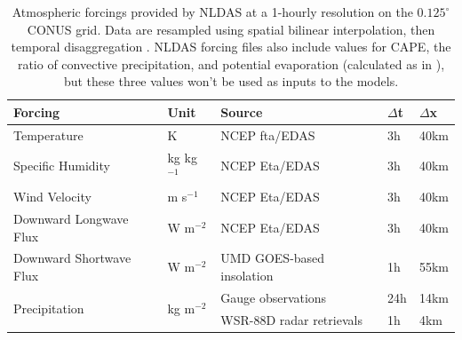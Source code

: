 \documentclass[11pt]{article}
\begin{document}
\begin{table}[h!]
    \centering
    \begin{tabular}{ l l l l l}
        Forcing & Unit & Source & $\Delta$t & $\Delta$x \\
        \hline
        Temperature & K & NCEP fta/EDAS & 3h & 40km \\
        Specific Humidity & kg kg$^{-1}$ & NCEP Eta/EDAS & 3h & 40km \\
        Wind Velocity & m s$^{-1}$ & NCEP Eta/EDAS & 3h & 40km \\
        Downward Longwave Flux & W m$^{-2}$ & NCEP Eta/EDAS & 3h & 40km \\
        Downward Shortwave Flux & W m$^{-2}$ & UMD GOES-based insolation & 1h & 55km \\
        \multirow{2}{*}{Precipitation} & \multirow{2}{*}{kg m$^{-2}$} & Gauge observations & 24h & 14km \\
        & & WSR-88D radar retrievals & 1h & 4km \\
    \end{tabular}
    \caption{Atmospheric forcings provided by NLDAS at a 1-hourly resolution on the $0.125^\circ$ CONUS grid. Data are resampled using spatial bilinear interpolation, then temporal disaggregation \cite{mitchell_multi-institution_2004}. NLDAS forcing files also include values for CAPE, the ratio of convective precipitation, and potential evaporation (calculated as in \cite{mahrt_influence_1984}), but these three values won't be used as inputs to the models.}
    \label{forcing}

\end{table}

\vspace{-1.2em}
\end{document}
